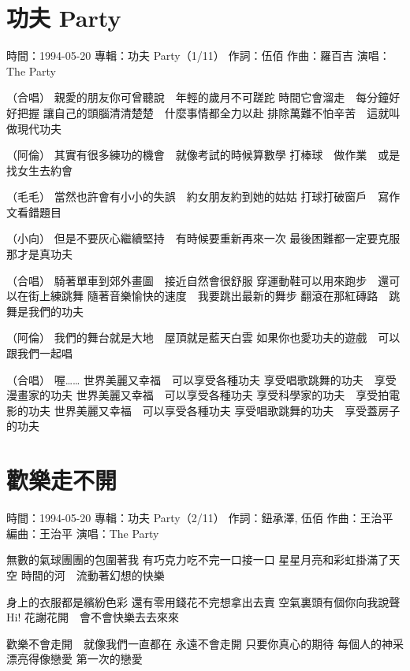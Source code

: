 \documentclass[UTF8,a4paper,oneside,twocolumn,12pt]{ctexbook}
\newcommand{\infopair}[2]{\textbullet #1：#2}
\newcommand{\zc}[1][伍佰]{\infopair{作詞}{#1}}
\newcommand{\zq}[1][伍佰]{\infopair{作曲}{#1}}
\newcommand{\bq}[1][伍佰]{\infopair{編曲}{#1}}
\newcommand{\zj}[1]{\infopair{專輯}{#1}}
\newcommand{\sj}[1]{\infopair{時間}{#1}}
\newenvironment{info}{\begin{flushleft}\kaishu
	}
	{\end{flushleft}\normalsize\yahei\par}
\newenvironment{lyric}{
	}
{}
\begin{document}
\section{功夫 Party}
\begin{info}
	\sj{1994-05-20}
	\zj{功夫 Party（1/11）}
	\zc
	\zq[羅百吉]
	\infopair{演唱}{The Party}
\end{info}
\begin{lyric}
	（合唱）
	親愛的朋友你可曾聽說　年輕的歲月不可蹉跎
	時間它會溜走　每分鐘好好把握
	讓自己的頭腦清清楚楚　什麼事情都全力以赴
	排除萬難不怕辛苦　這就叫做現代功夫

	（阿倫）
	其實有很多練功的機會　就像考試的時候算數學
	打棒球　做作業　或是找女生去約會

	（毛毛）
	當然也許會有小小的失誤　約女朋友約到她的姑姑
	打球打破窗戶　寫作文看錯題目

	（小向）
	但是不要灰心繼續堅持　有時候要重新再來一次
	最後困難都一定要克服　那才是真功夫

	（合唱）
	騎著單車到郊外畫圖　接近自然會很舒服
	穿運動鞋可以用來跑步　還可以在街上練跳舞
	隨著音樂愉快的速度　我要跳出最新的舞步
	翻滾在那紅磚路　跳舞是我們的功夫

	（阿倫）
	我們的舞台就是大地　屋頂就是藍天白雲
	如果你也愛功夫的遊戲　可以跟我們一起唱

	（合唱）
	喔……
	世界美麗又幸福　可以享受各種功夫
	享受唱歌跳舞的功夫　享受漫畫家的功夫
	世界美麗又幸福　可以享受各種功夫
	享受科學家的功夫　享受拍電影的功夫
	世界美麗又幸福　可以享受各種功夫
	享受唱歌跳舞的功夫　享受蓋房子的功夫
\end{lyric}

\section{歡樂走不開}
\begin{info}
	\sj{1994-05-20}
	\zj{功夫 Party（2/11）}
	\zc[鈕承澤, 伍佰]
	\zq[王治平]
	\bq[王治平]
	\infopair{演唱}{The Party}
\end{info}
\begin{lyric}
	無數的氣球團團的包圍著我
	有巧克力吃不完一口接一口
	星星月亮和彩虹掛滿了天空
	時間的河　流動著幻想的快樂

	身上的衣服都是繽紛色彩
	還有零用錢花不完想拿出去賣
	空氣裏頭有個你向我說聲Hi!
	花謝花開　會不會快樂去去來來

	歡樂不會走開　就像我們一直都在
	永遠不會走開 只要你真心的期待
	每個人的神采 漂亮得像戀愛 第一次的戀愛
\end{lyric}
\end{document}
